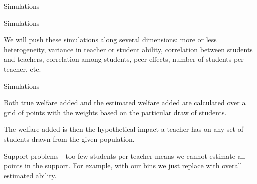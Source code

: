 \documentclass[11pt]{beamer}
\newenvironment{wideitemize}{\itemize\addtolength{\itemsep}{14pt}}{\enditemize}
\begin{document}
\begin{frame}{Simulations}
{}


\end{frame}



\begin{frame}{Simulations}

    We will push these simulations along several dimensions: more or less heterogeneity, variance in teacher or student ability, correlation between students and teachers, correlation among students, peer effects, number of students per teacher, etc.

\end{frame}



\begin{frame}{Simulations}

    \begin{wideitemize}
        \item Both true welfare added and the estimated welfare added are calculated over a grid of points with the weights based on the particular draw of students.
        \item The welfare added is then the hypothetical impact a teacher has on any set of students drawn from the given population.
        \item Support problems - too few students per teacher means we cannot estimate all points in the support. For example, with our bins we just replace with overall estimated ability.
    \end{wideitemize}

\end{frame}


\end{document}
